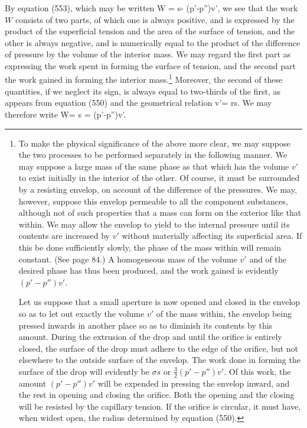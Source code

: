 \documentclass[12pt]{memoir}
\begin{document}
{By equation (553), which may be written
\eqs W = \sigma s- (p'-p'')v', \label{559}\eqe
we see that the work $W$ consists of two parts, of which one is always positive, and is expressed by the product of the superficial tension and the area of the surface of tension, and the other is always negative, and is numerically equal to the product of the difference of pressure by the volume of the interior mass. We may regard the first part as expressing the work spent in forming the surface of tension, and the second part the work gained in forming the interior mass.\footnote{To make the physical significance of the above more clear, we may suppose the two processes to be performed separately in the following manner. We may suppose a large mass of the same phase as that which has the volume $v'$ to exist initially in the interior of the other. Of course, it must be surrounded by a resisting envelop, on account of the difference of the pressures. We may, however, suppose this envelop permeable to all the component substances, although not of such properties that a mass can form on the exterior like that within. We may allow the envelop to yield to the internal pressure until its contents are increased by $v'$ without materially affecting its superficial area. If this be done sufficiently slowly, the phase of the mass within will remain constant. (See page 84.) A homogeneous mass of the volume $v'$ and of the desired phase has thus been produced, and the work gained is evidently $(p' -p'')v'$. \par
Let us suppose that a small aperture is now opened and closed in the envelop so as to let out exactly the volume $v'$ of the mass within, the envelop being pressed inwards in another place so as to diminish its contents by this amount. During the extrusion of the drop and until the orifice is entirely closed, the surface of the drop must adhere to the edge of the orifice, but not elsewhere to the outside surface of the envelop. The work done in forming the surface of the drop will evidently be $\sigma s$ or $\frac{3}{2}(p'-p'')v'$. Of this work, the amount $(p'-p'')v'$ will be expended in pressing the envelop inward, and the rest in opening and closing the orifice. Both the opening and the closing will be resisted by the capillary tension. If the orifice is circular, it must have, when widest open, the radius determined by equation (550).} Moreover, the second of these quantities, if we neglect its sign, is always equal to two-thirds of the first, as appears from equation (550) and the geometrical relation v'= rs. We may therefore write
\eqs  W= \sigma s = (p'-p'')v'. \label{560}\eqe
}
\end{document}
